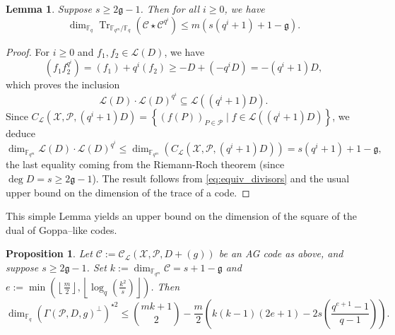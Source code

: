 \documentclass[a4paper]{article}
\newtheorem{proposition}[thm]{Proposition}
\newtheorem{lemma}[thm]{Lemma}
\theoremstyle{definition}
\theoremstyle{remark}
\newcommand{\calP}{\mathcal{P}}
\newcommand{\calL}{\mathcal{L}}
\newcommand{\calC}{\mathcal{C}}
\newcommand{\calX}{\mathcal{X}}
\newcommand{\fqm}{\mathbb{F}_{q^m}}
\newcommand{\fq}{\mathbb{F}_{q}}
\newcommand{\Tr}[1]{\operatorname{Tr}_{\mathbb{F}_{q^m}/\fq}\left(#1\right)}
\newcommand{\set}[1]{\left\{#1\right\}}
\begin{document}
\begin{lemma} \label{lem:bound_dim_Tr(C*C^q^i)}
  Suppose $s \geq 2\mathfrak{g}-1$. Then for all $i \geq 0$, we have 
   $$\dim_{\fq} \Tr{\calC\star \calC^{q^i}} \leq m\left(s\left(q^i+1\right)+1-\mathfrak{g}\right).$$
\end{lemma}
\begin{proof}
For $i \geq 0$ and $f_1,f_2 \in \calL(D)$, we have 
$$(f_1f_2^{q^i}) = (f_1)+q^i(f_2) \geq -D +(-q^iD) = -(q^i+1)D,$$
which proves the inclusion
$$ \calL(D)\cdot \calL(D)^{q^i} \subseteq \calL((q^i+1)D).$$
Since $C_{\calL}(\calX,\calP,(q^i+1)D) = \set{(f(P))_{P \in \calP} \mid f \in \calL((q^i+1)D)}$, we deduce 
$$ \dim_{\fqm} \calL(D) \cdot \calL(D)^{q^i} \leq \dim_{\fqm}\left(C_{\calL}(\calX,\calP,(q^i+1)D)\right) = s(q^i+1)+1-\mathfrak{g},$$
the last equality coming from the Riemann-Roch theorem (since $\deg D =s \geq 2\mathfrak{g}-1$). The result follows from \eqref{eq:equiv_divisors} and the usual upper bound on the dimension of the trace of a code. 
\end{proof}
This simple Lemma yields an upper bound on the dimension of the square of the dual of Goppa--like codes.
\begin{proposition} \label{prop:bound_dim_using_inclusions}
    Let $\calC := \calC_{\calL}(\calX,\calP,D+(g))$ be an AG code as above, and suppose $s \geq 2\mathfrak{g}-1$. Set $k := \dim_{\fqm}\calC = s+1-\mathfrak{g}$ and  $e := \min\left(\left\lfloor \frac{m}{2} \right\rfloor,\left\lfloor \log_q\left(\frac{k^2}{s}\right)\right\rfloor\right)$. Then
    $$\dim_{\fq} (\Gamma(\calP,D,g)^{\perp})^{\star 2} \leq \binom{mk+1}{2} - \dfrac{m}{2}\left(k(k-1)(2e+1)-2s\left(\dfrac{q^{e+1}-1}{q-1}\right)\right).$$
\end{proposition}
\end{document}
